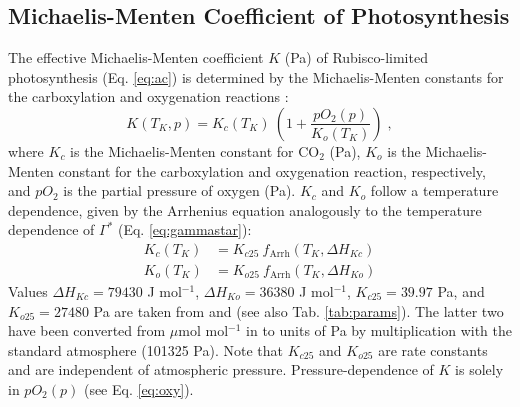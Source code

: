 \documentclass[gmd, manuscript]{copernicus}
\begin{document}
\subsection{Michaelis-Menten Coefficient of Photosynthesis}
\label{sec:kmm}
The effective Michaelis-Menten coefficient $K$ (Pa) of Rubisco-limited photosynthesis (Eq. \ref{eq:ac}) is determined by the Michaelis-Menten constants for the carboxylation and oxygenation reactions \citep{farquhar80}:
\begin{equation}
\label{eq:michaelis}
  K(T_K, p) = K_c(T_K)\: \left( 1 + \frac{pO_2(p)}{K_o(T_K)} \right) \;,
\end{equation}
where $K_c$ is the Michaelis-Menten constant for CO$_2$ (Pa), $K_o$ is the Michaelis-Menten constant for the carboxylation and oxygenation reaction, respectively, and $pO_2$ is the partial pressure of oxygen (Pa). $K_c$ and $K_o$ follow a temperature dependence, given by the Arrhenius equation analogously to the temperature dependence of $\Gamma^\ast$ (Eq. \ref{eq:gammastar}):
\begin{subequations}
\label{eq:kcko}
\begin{align}
  K_c(T_K)& = K_{c25}\: f_{\text{Arrh}}(T_K, \Delta H_{Kc}) \label{eq:kc} \\
    K_o(T_K)& = K_{o25}\: f_{\text{Arrh}}(T_K, \Delta H_{Ko}) \label{eq:ko}
\end{align}
\end{subequations}
Values $\Delta H_{Kc} = 79430$ J mol$^{-1}$, $\Delta H_{Ko} = 36380$ J mol$^{-1}$, $K_{c25} = 39.97$ Pa, and $K_{o25} = 27480$ Pa are taken from \citet{bernacchi01} and (see also Tab. \ref{tab:params}). The latter two have been converted from $\mu$mol mol$^{-1}$ in \citet{bernacchi01} to units of Pa by multiplication with the standard atmosphere (101325 Pa). Note that $K_{c25}$ and $K_{o25}$ are rate constants and are independent of atmospheric pressure. Pressure-dependence of $K$ is solely in $pO_2(p)$ (see Eq. \ref{eq:oxy}).

\end{document}
